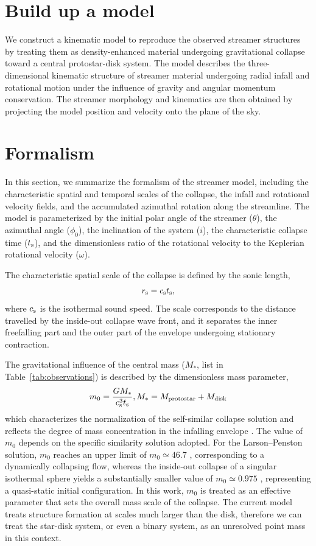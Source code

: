 \section{Build up a model}
We construct a kinematic model to reproduce the observed streamer structures by treating them as density-enhanced material undergoing gravitational collapse toward a central protostar-disk system. The model describes the three-dimensional kinematic structure of streamer material undergoing radial infall and rotational motion under the influence of gravity and angular momentum conservation. The streamer morphology and kinematics are then obtained by projecting the model position and velocity onto the plane of the sky.

\section{Formalism}\label{Sub-sec:Formalism}
In this section, we summarize the formalism of the streamer model, including the characteristic spatial and temporal scales of the collapse, the infall and rotational velocity fields, and the accumulated azimuthal rotation along the streamline. The model is parameterized by the initial polar angle of the streamer ($\theta$), the azimuthal angle ($\phi_0$), the inclination of the system ($i$), the characteristic collapse time ($t_{\rm s}$), and the dimensionless ratio of the rotational velocity to the Keplerian rotational velocity ($\omega$).

The characteristic spatial scale of the collapse is defined by the sonic length,
\begin{align}\label{eq:rs}
    r_{\rm s} = c_{\rm s} t_{\rm s},
\end{align}
where $c_{\rm s}$ is the isothermal sound speed. The scale corresponds to the distance travelled by the inside-out collapse wave front, and it separates the inner freefalling part and the outer part of the envelope undergoing stationary contraction. 

The gravitational influence of the central mass ($M_*$, list in Table~\ref{tab:observations}) is described by the dimensionless mass parameter,
\begin{align}\label{eq:m_0}
    m_0 = \frac{GM_*}{c_{\rm s}^3 t_{\rm s}}, M_* = M_{\rm protostar} + M_{\rm disk}
\end{align}
which characterizes the normalization of the self-similar collapse solution and reflects the degree of mass concentration in the infalling envelope \citep[e.g.,][]{Whitworth_1985}. The value of $m_0$ depends on the specific similarity solution adopted. For the Larson--Penston solution, $m_0$ reaches an upper limit of $m_0 \simeq 46.7$ \citep{Larson_1969, Penston_1969}, corresponding to a dynamically collapsing flow, whereas the inside-out collapse of a singular isothermal sphere yields a substantially smaller value of $m_0 \simeq 0.975$ \citep{Shu_1977}, representing a quasi-static initial configuration. In this work, $m_0$ is treated as an effective parameter that sets the overall mass scale of the collapse. The current model treats structure formation at scales much larger than the disk, therefore we can treat the star-disk system, or even a binary system, as an unresolved point mass in this context. 

